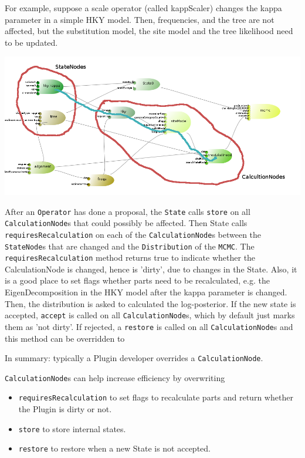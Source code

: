 \documentclass{article}
\begin{document}
For example, suppose a scale operator (called kappScaler) changes the kappa parameter in
a simple HKY model. Then, frequencies, and the tree are not affected, but the substitution
model, the site model and the tree likelihood need to be updated.

\includegraphics[width=\textwidth]{hky.png}

After an {\tt Operator} has done a proposal, the {\tt State} calls {\tt store} on all {\tt CalculationNode}s
that could possibly be affected.
Then State calls {\tt requiresRecalculation} on each of the 
{\tt CalculationNode}s between the {\tt StateNode}s that are changed and the {\tt Distribution} of the {\tt MCMC}.
The {\tt requiresRecalculation} method returns true to indicate whether the CalculationNode
is changed, hence is 'dirty', due to changes in the State. Also, it is a good place to set
flags whether parts need to be recalculated, e.g. the EigenDecomposition in the HKY model
after the kappa parameter is changed.
Then, the distribution is asked to calculated the log-posterior. If the new state is
accepted, {\tt accept} is called on all {\tt CalculationNode}s, which by default just marks
them as 'not dirty'. If rejected, a {\tt restore} is called on all {\tt CalculationNode}s
and this method can be overridden to 


In summary: typically a Plugin developer overrides a {\tt CalculationNode}.

{\tt CalculationNode}s can help increase efficiency by overwriting
\begin{itemize}
\item {\tt requiresRecalculation} to set flags to recalculate parts and return
whether the Plugin is dirty or not.
\item {\tt store} to store internal states.
\item {\tt restore} to restore when a new State is not accepted.
\end{itemize}
\end{document}
